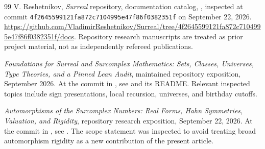 \documentclass[11pt,letterpaper]{article}
\theoremstyle{definition}
\theoremstyle{remark}
\begin{document}
\begin{thebibliography}{99}
V. Reshetnikov, \emph{Surreal} repository, documentation catalog,
, inspected at commit
\texttt{4f2645599121fa872c7104995e47f86f0382351f} on September 22, 2026.
\url{https://github.com/VladimirReshetnikov/Surreal/tree/4f2645599121fa872c7104995e47f86f0382351f/docs}.
Repository research manuscripts are treated as prior project material,
not as independently refereed publications.

\emph{Foundations for Surreal and Surcomplex Mathematics: Sets, Classes,
Universes, Type Theories, and a Pinned Lean Audit}, maintained repository
exposition, September 2026. At the commit in \cite{RepoCatalog}, see
and its README. Relevant inspected topics include sign presentations,
local recursion, universes, and birthday cutoffs.

\emph{Automorphisms of the Surcomplex Numbers: Real Forms, Hahn Symmetries,
Valuation, and Rigidity}, repository research exposition,
September 22, 2026. At the commit in \cite{RepoCatalog}, see
.
The scope statement was inspected to avoid treating broad automorphism
rigidity as a new contribution of the present article.

\end{thebibliography}
\end{document}
